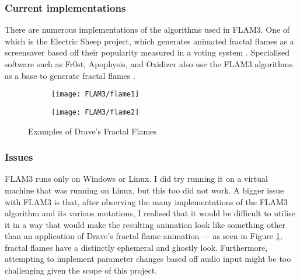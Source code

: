\documentclass[../../initial_thesis.tex]{subfiles}
\begin{document}
\subsubsection{Current implementations}
There are numerous implementations of the algorithms used in FLAM3. One of which is the Electric Sheep project, which generates animated fractal flames as a screensaver based off their popularity measured in a voting system \cite{Dravesa}. Specialised software such as Fr0st, Apophysis, and Oxidizer also use the FLAM3 algorithms as a base to generate fractal flames \cite{Dravesb}.

\begin{figure}
  \begin{subfigure}{0.5\textwidth}
    \centering
    \texttt{[image: FLAM3/flame1]}
  \end{subfigure}
  \begin{subfigure}{0.5\textwidth}
    \centering
    \texttt{[image: FLAM3/flame2]}
  \end{subfigure}
  \caption{Examples of Drave's Fractal Flames \cite{Draves1993}}
  \label{fig:flames}
\end{figure}

\subsubsection{Issues}
FLAM3 runs only on Windows or Linux. I did try running it on a virtual machine that was running on Linux, but this too did not work. A bigger issue with FLAM3 is that, after observing the many implementations of the FLAM3 algorithm and its various mutations, I realised that it would be difficult to utilise it in a way that would make the resulting animation look like something other than an application of Drave's fractal flame animation --- as seen in Figure \ref{fig:flames}, fractal flames have a distinctly ephemeral and ghostly look. Furthermore, attempting to implement parameter changes based off audio input might be too challenging given the scope of this project.
\end{document}

